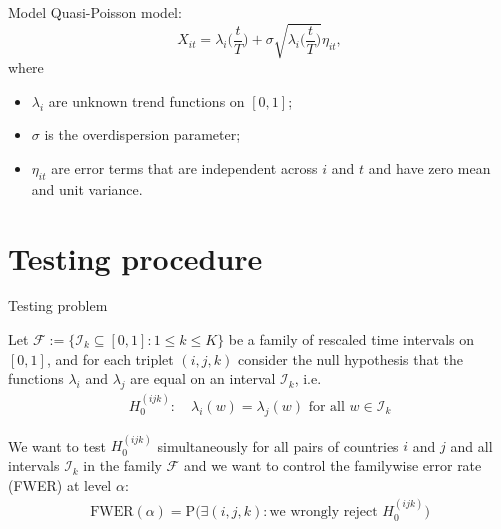 \documentclass[10pt, handout]{beamer}
\newcommand{\Prob}{\mathrm{P}}
\begin{document}
\begin{frame}{Model}
Quasi-Poisson model:
\begin{equation*}
X_{it} = \lambda_i \Big( \frac{t}{T} \Big) + \sigma\sqrt{\lambda_i \Big( \frac{t}{T} \Big)} \eta_{it},
\end{equation*}\pause
\vspace{-3mm}
where
\begin{itemize}
\item $\lambda_i$ are unknown trend functions on $[0,1]$;\pause
\item $\sigma$ is the overdispersion parameter;\pause
\item $\eta_{it}$ are error terms that are independent across $i$ and $t$ and have zero mean and unit variance.
\end{itemize}
\end{frame}

\section{Testing procedure}
\begin{frame}{Testing problem}

Let $\mathcal{F} :=\{ \mathcal{I}_k \subseteq [0, 1]: 1 \le k \le K\}$ be a family of rescaled time intervals on $[0, 1]$, and for each triplet $(i, j, k)$ consider the null hypothesis that the functions $\lambda_i$ and $\lambda_j$ are equal on an interval $\mathcal{I}_k$\pause, i.e.
\begin{align*}
H_0^{(ijk)}:\quad  \lambda_i(w) = \lambda_j(w) \text{ for all } w\in \mathcal{I}_k
\end{align*}\pause
\vspace{-2mm}

We want to test $H_0^{(ijk)}$ simultaneously for all pairs of countries $i$ and $j$ and all intervals $\mathcal{I}_k$ in the family $\mathcal{F}$ and we want to control the familywise error rate (FWER) at level $\alpha$\pause:
\begin{align*}
\text{FWER}(\alpha) = \Prob \Big( \exists (i,j,k): \text{we wrongly reject } H_0^{(ijk)} \Big)
\end{align*}
\end{frame} 
\end{document}
